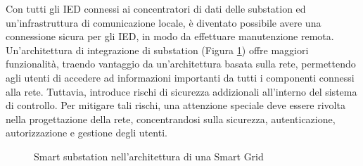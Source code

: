 Con tutti gli IED connessi ai concentratori di dati delle substation ed un'infrastruttura di comunicazione locale, è diventato possibile avere una connessione sicura per gli IED, in modo da effettuare manutenzione remota.
\\ 
Un'architettura di integrazione di substation (Figura \ref{fig:29}) offre maggiori funzionalità, traendo vantaggio da un'architettura basata sulla rete, permettendo agli utenti di accedere ad informazioni importanti da tutti i componenti connessi alla rete. Tuttavia, introduce rischi di sicurezza addizionali all'interno del sistema di controllo. Per mitigare tali rischi, una attenzione speciale deve essere rivolta nella progettazione della rete, concentrandosi sulla sicurezza, autenticazione, autorizzazione e gestione degli utenti. 
\begin{figure}[h] 
\caption{Smart substation nell'architettura di una Smart Grid}\label{fig:29}
\end{figure}

\newpage
